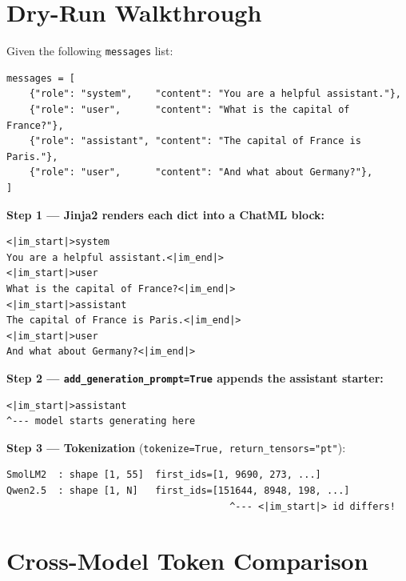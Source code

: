 \documentclass[11pt,a4paper]{article}
\begin{document}
\section{Dry-Run Walkthrough}

Given the following \texttt{messages} list:

\begin{lstlisting}[style=pycode]
messages = [
    {"role": "system",    "content": "You are a helpful assistant."},
    {"role": "user",      "content": "What is the capital of France?"},
    {"role": "assistant", "content": "The capital of France is Paris."},
    {"role": "user",      "content": "And what about Germany?"},
]
\end{lstlisting}

\noindent\textbf{Step 1 --- Jinja2 renders each dict into a ChatML block:}

\begin{lstlisting}[style=chatml]
<|im_start|>system
You are a helpful assistant.<|im_end|>
<|im_start|>user
What is the capital of France?<|im_end|>
<|im_start|>assistant
The capital of France is Paris.<|im_end|>
<|im_start|>user
And what about Germany?<|im_end|>
\end{lstlisting}

\noindent\textbf{Step 2 --- \texttt{add\_generation\_prompt=True} appends the assistant starter:}

\begin{lstlisting}[style=chatml]
<|im_start|>assistant
^--- model starts generating here
\end{lstlisting}

\noindent\textbf{Step 3 --- Tokenization} (\texttt{tokenize=True, return\_tensors="pt"}):

\begin{lstlisting}[style=chatml]
SmolLM2  : shape [1, 55]  first_ids=[1, 9690, 273, ...]
Qwen2.5  : shape [1, N]   first_ids=[151644, 8948, 198, ...]
                                       ^--- <|im_start|> id differs!
\end{lstlisting}

\section{Cross-Model Token Comparison}
\end{document}
